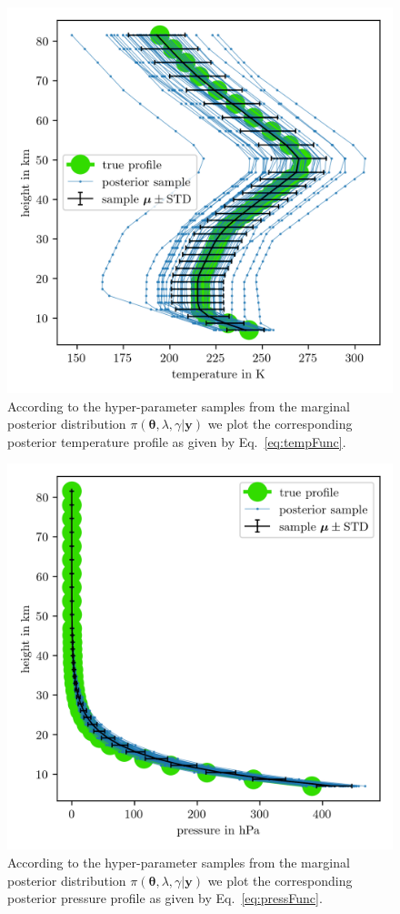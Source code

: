 \begin{figure}[ht!]
	\centering
	\includegraphics{TempPostMeanSigm.png} 
	\caption[Temperature posterior samples.]{According to the hyper-parameter samples from the marginal posterior distribution $\pi(\bm{\theta},\lambda,\gamma  | \bm{y})$ we plot the corresponding posterior temperature profile as given by Eq.~\ref{eq:tempFunc}. }
	\label{fig:TempPost}
\end{figure}
\begin{figure}[ht!]
	\centering
	\includegraphics{PressPostMeanSigm.png}
	\caption[Pressure posterior samples.]{According to the hyper-parameter samples from the marginal posterior distribution $\pi(\bm{\theta},\lambda,\gamma  | \bm{y})$ we plot the corresponding posterior pressure profile as given by Eq.~\ref{eq:pressFunc}.}
	\label{fig:PressPost}
\end{figure}
\clearpage
